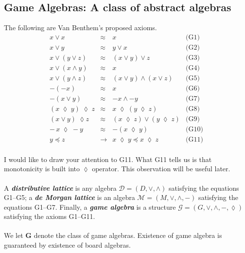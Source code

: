 \documentclass[12pt]{article}
\begin{document}
\subsection{Game Algebras: A class of abstract algebras}
\noindent The following are Van Benthem's proposed axioms. 
\[
\begin{array}{rcll}
x \lor x & \approx & x & \text{(G1)} \\[6pt]
x \lor y & \approx & y \lor x & \text{(G2)} \\[6pt]
x \lor (y \lor z) & \approx & (x \lor y) \lor z & \text{(G3)} \\[6pt]
x \lor (x \land y) & \approx & x & \text{(G4)} \\[6pt]
x \lor (y \land z) & \approx & (x \lor y) \land (x \lor z) & \text{(G5)} \\[6pt]
-(-x) & \approx & x & \text{(G6)} \\[6pt]
-(x \lor y) & \approx & -x \land -y & \text{(G7)} \\[6pt]
(x\; \lozenge \; y) \; \lozenge \; z & \approx & x\; \lozenge\; (y \; \lozenge \; z) & \text{(G8)} \\[6pt]
(x \lor y)\; \lozenge z & \approx & (x\; \lozenge \; z) \lor (y \; \lozenge \; z) & \text{(G9)} \\[6pt]
-\,x \; \lozenge \; -y & \approx & -(x \; \lozenge \; y) & \text{(G10)} \\[6pt]
y \preceq z & \to & x \; \lozenge \; y \preceq x \; \lozenge \; z & \text{(G11)} 
\end{array}
\]
\\
I would like to draw your attention to G11. What G11 tells us is that monotonicity is built into $\lozenge$ operator. This observation will be useful later. \\ \\
A \textbf{\emph{distributive lattice}} is any algebra 
$\mathcal{D} = (D, \lor, \land)$ satisfying the equations G1--G5;  
a \textbf{\emph{de Morgan lattice}} is an algebra 
$\mathcal{M} = (M, \lor, \land, -)$ satisfying the equations G1--G7.  
Finally, a \textbf{\emph{game algebra}} is a structure 
$\mathcal{G} = (G, \lor, \land, -, \lozenge)$ satisfying the axioms G1--G11. \\ \\ 
We let $\mathbf{G}$ denote the class of game algebras. Existence of game algebra is guaranteed by existence of board algebras.
\end{document}
